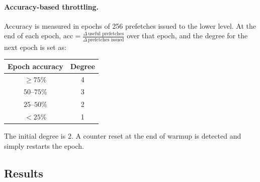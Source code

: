 \documentclass[11pt]{article}
\begin{document}
\paragraph{Accuracy-based throttling.}
Accuracy is measured in epochs of 256 prefetches issued to the lower level. At the end of
each epoch,
$\text{acc} = \frac{\Delta\,\text{useful prefetches}}{\Delta\,\text{prefetches issued}}$
over that epoch, and the degree for the next epoch is set as:
\begin{center}
\begin{tabular}{cc}
\toprule
Epoch accuracy & Degree \\
\midrule
$\geq 75\%$ & 4 \\
$50$--$75\%$ & 3 \\
$25$--$50\%$ & 2 \\
$< 25\%$ & 1 \\
\bottomrule
\end{tabular}
\end{center}
The initial degree is 2. A counter reset at the end of warmup is detected and simply restarts the epoch.

\subsection{Results}
\end{document}
